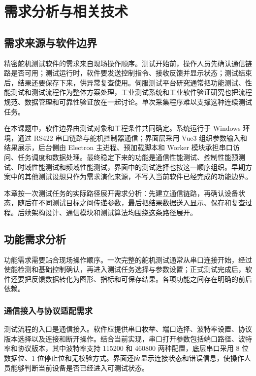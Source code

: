 \chapter{需求分析与相关技术}

\section{需求来源与软件边界}

精密舵机测试软件的需求来自现场操作顺序。测试开始前，操作人员先确认通信链路是否可用；测试运行时，软件要发送控制指令、接收反馈并显示状态；测试结束后，结果还要保存下来，供异常复查使用。伺服测试平台研究通常把功能测试、性能测试和测试流程作为整体方案处理，工业测试系统和工业软件验证研究也把流程规范、数据管理和可靠性验证放在一起讨论\cite{li2014servotest,xu2021industry4test,liu2022industrialsoftware}。单次采集程序难以支撑这种连续测试任务。

在本课题中，软件边界由测试对象和工程条件共同确定。系统运行于 Windows 环境，通过 RS422 串口链路与舵机控制器通信；界面层采用 Vue3 组织参数输入和结果展示，后台侧由 Electron 主进程、预加载脚本和 Worker 模块承担串口访问、任务调度和数据处理。最终稳定下来的功能是通信性能测试、控制性能预测试、时域性能测试和频域性能测试，界面中的测试选择也按这一顺序组织。早期方案中的其他测试设想只作为需求演化来源，不写入当前软件已经完成的功能边界。

本章按一次测试任务的实际路径展开需求分析：先建立通信链路，再确认设备状态，随后在不同测试目标之间传递参数，最后把结果数据送入显示、保存和复查过程。后续架构设计、通信模块和测试算法均围绕这条路径展开。

\section{功能需求分析}

功能需求需要贴合现场操作顺序。一次完整的舵机测试通常从串口连接开始，经过使能检测和基础控制确认，再进入测试任务选择与参数设置；正式测试完成后，软件还要把反馈数据转化为图形、指标和可保存结果。各项功能之间存在明确的前后依赖。

\subsection{通信接入与协议适配需求}

测试流程的入口是通信接入。软件应提供串口枚举、端口选择、波特率设置、协议版本选择以及连接和断开操作。结合当前实现，串口打开参数包括端口路径、波特率和协议版本，其中波特率支持 115200 和 460800 两种配置，底层串口采用 8 位数据位、1 位停止位和无校验方式。界面还应显示连接状态和错误信息，使操作人员能够判断当前设备是否已经进入可测试状态。

